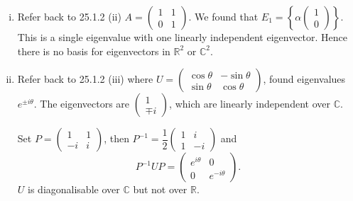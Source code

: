 \documentclass[a4paper]{article}
\begin{document}
    \begin{example}
      \begin{enumerate}[(i)]
        \item Refer back to 25.1.2 (ii) $ A=
          \begin{pmatrix}
            1&1\\0&1
          \end{pmatrix} $. We found that $ E_1=\left\{ \alpha
            \begin{pmatrix}
              1\\0
          \end{pmatrix} \right\} $. This is a single eigenvalue with
          one linearly independent eigenvector. Hence there is no
          basis for eigenvectors in $ \mathbb{R}^{2} $ or $ \mathbb{C}^{2} $.
        \item Refer back to 25.1.2 (iii) where $U =
          \begin{pmatrix}
            \cos \theta&-\sin \theta\\
            \sin \theta&\cos \theta
          \end{pmatrix}$, found eigenvalues $ e^{\pm i\theta} $. The
          eigenvectors are $
          \begin{pmatrix}
            1\\\mp i
          \end{pmatrix} $, which are linearly independent over $\mathbb{C}$.

          Set $ P=
          \begin{pmatrix}
            1&1\\-i&i
          \end{pmatrix} $, then $ P^{-1}=\dfrac{1}{2}
          \begin{pmatrix}
            1&i\\1&-i
          \end{pmatrix} $ and
          \[
            P^{-1}UP=
            \begin{pmatrix}
              e^{i\theta}&0\\
              0&e^{-i\theta}
            \end{pmatrix}
          .\]
          $U$ is diagonalisable over $ \mathbb{C}  $ but not over $
          \mathbb{R}  $.
      \end{enumerate}
    \end{example}
\end{document}
